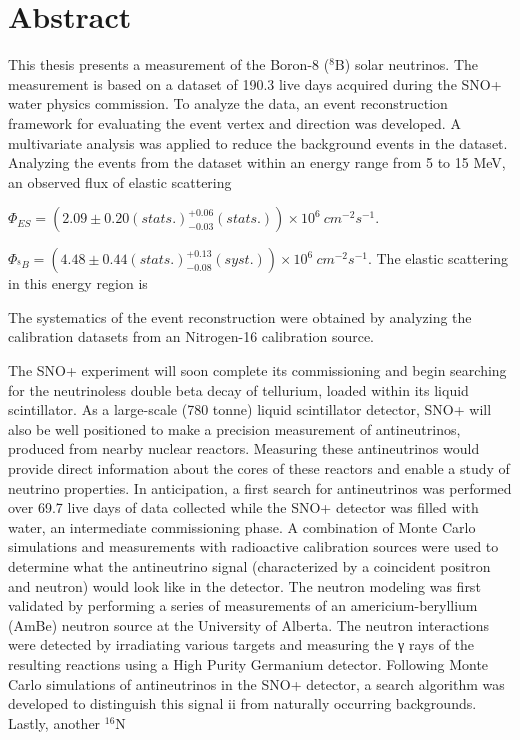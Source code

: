 \section{Abstract}

This thesis presents a measurement of the Boron-8 ($^8$B) solar neutrinos. The measurement is based on a dataset of 190.3 live days acquired during the SNO+ water physics commission. To analyze the data, an event reconstruction framework for evaluating the event vertex and direction was developed. A multivariate analysis was applied to reduce the background events in the dataset. Analyzing the events from the dataset within an energy range from 5 to 15 MeV, an observed flux of elastic scattering 

 
$\Phi_{ES}=(2.09 \pm 0.20(stats.)^{+0.06}_{-0.03}(stats.))\times10^6~cm^{-2}s^{-1}$. 
 
$\Phi_{^8B}=(4.48 \pm 0.44(stats.)^{+0.13}_{-0.08}(syst.))\times10^6~cm^{-2}s^{-1}$. The elastic scattering in this energy region is 


The systematics of the event reconstruction were obtained by analyzing the calibration datasets from an Nitrogen-16 calibration source. 






The SNO+ experiment will soon complete its commissioning and begin
searching for the neutrinoless double beta decay of tellurium, loaded within
its liquid scintillator. As a large-scale (780 tonne) liquid scintillator detector,
SNO+ will also be well positioned to make a precision measurement of antineutrinos, produced from nearby nuclear reactors. Measuring these antineutrinos
would provide direct information about the cores of these reactors and enable
a study of neutrino properties. In anticipation, a first search for antineutrinos
was performed over 69.7 live days of data collected while the SNO+ detector was filled with water, an intermediate commissioning phase. A combination of Monte Carlo simulations and measurements with radioactive calibration
sources were used to determine what the antineutrino signal (characterized by
a coincident positron and neutron) would look like in the detector.
The neutron modeling was first validated by performing a series of measurements of an americium-beryllium (AmBe) neutron source at the University of
Alberta. The neutron interactions were detected by irradiating various targets and measuring the γ rays of the resulting reactions using a High Purity
Germanium detector. Following Monte Carlo simulations of antineutrinos in
the SNO+ detector, a search algorithm was developed to distinguish this signal
ii
from naturally occurring backgrounds. Lastly, another $^{16}$N

